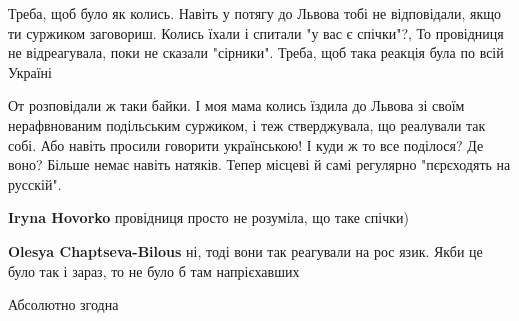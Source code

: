\begin{itemize}
 

Треба, щоб було як колись. Навіть у потягу до Львова тобі не відповідали, якщо
ти суржиком заговориш. Колись їхали і спитали "у вас є спічки"?, То провідниця
не відреагувала, поки не сказали "сірники". Треба, щоб така реакція була по
всій Україні

\begin{itemize}
 

От розповідали ж таки байки. І моя мама колись їздила до Львова зі своїм
нерафвнованим подільським суржиком, і теж стверджувала, що реалували так собі.
Або навіть просили говорити українською! І куди ж то все поділося? Де воно?
Більше немає навіть натяків. Тепер місцеві й самі регулярно "пєрєходять на
русскій".


 
\textbf{Iryna Hovorko} провідниця просто не розуміла, що таке спічки)

 
\textbf{Olesya Chaptseva-Bilous} ні, тоді вони так реагували на рос язик. Якби це було так і зараз, то не було б там напрієхавших
\end{itemize}

 
Абсолютно згодна


\end{itemize}
